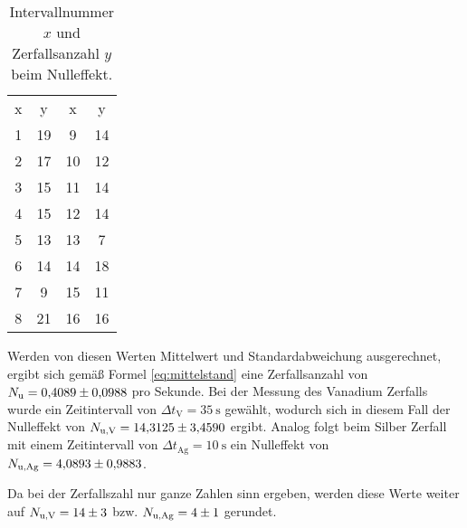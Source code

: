 \begin{table}[H]
    \centering
    \caption[short]{Intervallnummer $x$ und Zerfallsanzahl $y$ beim Nulleffekt.}
    \label{tab:nulleffekt}
    \begin{tabular}{S S S S}
        \toprule
        {x} & {y} & {x} & {y} \\
        \cmidrule(lr){1-2}\cmidrule(lr){3-4}
        1 & 19 &  9 & 14 \\
        2 & 17 & 10 & 12 \\
        3 & 15 & 11 & 14 \\
        4 & 15 & 12 & 14 \\
        5 & 13 & 13 &  7 \\
        6 & 14 & 14 & 18 \\
        7 &  9 & 15 & 11 \\
        8 & 21 & 16 & 16 \\
        \bottomrule
    \end{tabular}
\end{table}

\noindent
Werden von diesen Werten Mittelwert und Standardabweichung ausgerechnet, ergibt sich gemäß Formel \eqref{eq:mittelstand} 
eine Zerfallsanzahl von $N_\text{u} = \num[]{0.4089 +- 0.0988}$ pro Sekunde.
Bei der Messung des Vanadium Zerfalls wurde ein Zeitintervall von $\Delta t_\text{V} = \qty[]{35}{\second}$ gewählt, 
wodurch sich in diesem Fall der Nulleffekt von $N_\text{u,V} = \num[]{14.3125 +- 3.4590}$ ergibt.
Analog folgt beim Silber Zerfall mit einem Zeitintervall von $\Delta t_\text{Ag} = \qty[]{10}{\second}$ ein Nulleffekt von 
$N_\text{u,Ag} = \num[]{4.0893 +- 0.9883}$.

\noindent
Da bei der Zerfallszahl nur ganze Zahlen sinn ergeben, werden diese Werte weiter auf $N_\text{u,V} = \num[]{14 +- 3}$ bzw.
$N_\text{u,Ag} = \num[]{4 +- 1}$ gerundet.


